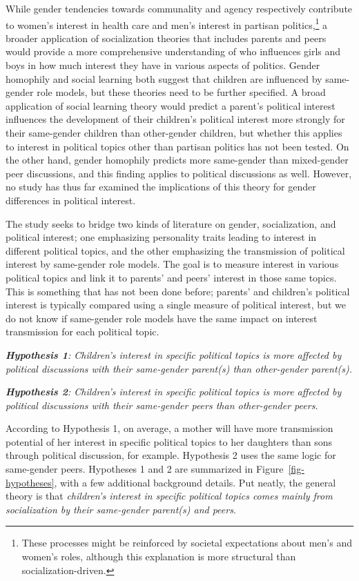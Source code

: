 \documentclass[
  letterpaper,
  DIV=11,
  numbers=noendperiod]{scrreprt}
\begin{document}
While gender tendencies towards communality and agency respectively
contribute to women's interest in health care and men's interest in
partisan politics,\footnote{These processes might be reinforced by
  societal expectations about men's and women's roles, although this
  explanation is more structural than socialization-driven.} a broader
application of socialization theories that includes parents and peers
would provide a more comprehensive understanding of who influences girls
and boys in how much interest they have in various aspects of politics.
Gender homophily and social learning both suggest that children are
influenced by same-gender role models, but these theories need to be
further specified. A broad application of social learning theory would
predict a parent's political interest influences the development of
their children's political interest more strongly for their same-gender
children than other-gender children, but whether this applies to
interest in political topics other than partisan politics has not been
tested. On the other hand, gender homophily predicts more same-gender
than mixed-gender peer discussions, and this finding applies to
political discussions as well. However, no study has thus far examined
the implications of this theory for gender differences in political
interest.

The study seeks to bridge two kinds of literature on gender,
socialization, and political interest; one emphasizing personality
traits leading to interest in different political topics, and the other
emphasizing the transmission of political interest by same-gender role
models. The goal is to measure interest in various political topics and
link it to parents' and peers' interest in those same topics. This is
something that has not been done before; parents' and children's
political interest is typically compared using a single measure of
political interest, but we do not know if same-gender role models have
the same impact on interest transmission for each political topic.

\emph{\textbf{Hypothesis 1}: Children's interest in specific political
topics is more affected by political discussions with their same-gender
parent(s) than other-gender parent(s).}

\emph{\textbf{Hypothesis 2}: Children's interest in specific political
topics is more affected by political discussions with their same-gender
peers than other-gender peers.}

According to Hypothesis 1, on average, a mother will have more
transmission potential of her interest in specific political topics to
her daughters than sons through political discussion, for example.
Hypothesis 2 uses the same logic for same-gender peers. Hypotheses 1 and
2 are summarized in Figure~\ref{fig-hypotheses}, with a few additional
background details. Put neatly, the general theory is that
\emph{children's interest in specific political topics comes mainly from
socialization by their same-gender parent(s) and peers}.
\end{document}
